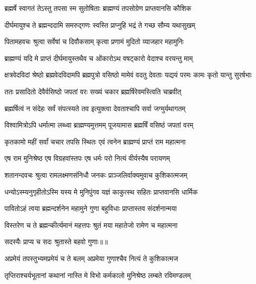\twolineshloka
{ब्रह्मर्षे स्वागतं तेऽस्तु तपसा स्म सुतोषिताः}
{ब्राह्मण्यं तपसोग्रेण प्राप्तवानसि कौशिक} %

\twolineshloka
{दीर्घमायुश्च ते ब्रह्मन्ददामि समरुद्गणः}
{स्वस्ति प्राप्नुहि भद्रं ते गच्छ सौम्य यथासुखम्} %

\twolineshloka
{पितामहवचः श्रुत्वा सर्वेषां च दिवौकसाम्}
{कृत्वा प्रणामं मुदितो व्याजहार महामुनिः} %

\twolineshloka
{ब्राह्मण्यं यदि मे प्राप्तं दीर्घमायुस्तथैव च}
{ओंकारोऽथ वषट्कारो वेदाश्च वरयन्तु माम्} %

\threelineshloka
{क्षत्रवेदविदां श्रेष्ठो ब्रह्मवेदविदामपि}
{ब्रह्मपुत्रो वसिष्ठो मामेवं वदतु देवताः}
{यद्ययं परमः कामः कृतो यान्तु सुरर्षभाः} %

\twolineshloka
{ततः प्रसादितो देवैर्वसिष्ठो जपतां वरः}
{सख्यं चकार ब्रह्मर्षिरेवमस्त्विति चाब्रवीत्} %

\twolineshloka
{ब्रह्मर्षित्वं न संदेहः सर्वं संपत्स्यते तव}
{इत्युक्त्वा देवताश्चापि सर्वा जग्मुर्यथागतम्} %

\twolineshloka
{विश्वामित्रोऽपि धर्मात्मा लब्ध्वा ब्राह्मण्यमुत्तमम्}
{पूजयामास ब्रह्मर्षिं वसिष्ठं जपतां वरम्} %

\twolineshloka
{कृतकामो महीं सर्वां चचार तपसि स्थितः}
{एवं त्वनेन ब्राह्मण्यं प्राप्तं राम महात्मना} %

\twolineshloka
{एष राम मुनिश्रेष्ठ एष विग्रहवांस्तपः}
{एष धर्मः परो नित्यं वीर्यस्यैष परायणम्} %

\twolineshloka
{शतानन्दवचः श्रुत्वा रामलक्ष्मणसंनिधौ}
{जनकः प्राञ्जलिर्वाक्यमुवाच कुशिकात्मजम्} %

\twolineshloka
{धन्योऽस्म्यनुगृहीतोऽस्मि यस्य मे मुनिपुंगव}
{यज्ञं काकुत्स्थ सहितः प्राप्तवानसि धार्मिक} %

\twolineshloka
{पावितोऽहं त्वया ब्रह्मन्दर्शनेन महामुने}
{गुणा बहुविधाः प्राप्तास्तव संदर्शनान्मया} %

\twolineshloka
{विस्तरेण च ते ब्रह्मन्कीर्त्यमानं महत्तपः}
{श्रुतं मया महातेजो रामेण च महात्मना} %

{सदस्यैः प्राप्य च सदः श्रुतास्ते बहवो गुणाः॥॥} %

\addtocounter{shlokacount}{1}

\twolineshloka
{अप्रमेयं तपस्तुभ्यमप्रमेयं च ते बलम्}
{अप्रमेया गुणाश्चैव नित्यं ते कुशिकात्मज} %

\twolineshloka
{तृप्तिराश्चर्यभूतानां कथानां नास्ति मे विभो}
{कर्मकालो मुनिश्रेष्ठ लम्बते रविमण्डलम्} %

